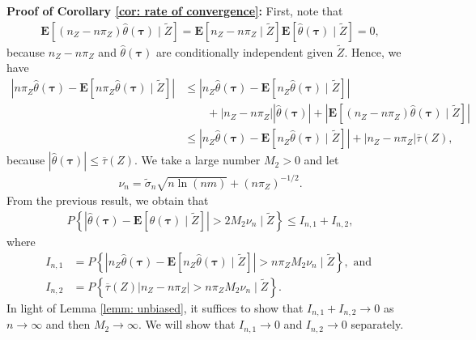 \documentclass[12pt, fullpage]{amsart}
\theoremstyle{definition}
\theoremstyle{definition}
\theoremstyle{definition}
\begin{document}
\begin{bibunit}[econometrica]
\noindent \textbf{Proof of Corollary \ref{cor: rate of convergence}:} First, note that 
\begin{align*}
    \mathbf{E}[(n_Z - n \pi_Z) \hat \theta(\boldsymbol{\tau}) \mid \tilde Z] = \mathbf{E}[n_Z - n \pi_Z \mid \tilde Z] \mathbf{E}[ \hat \theta(\boldsymbol{\tau}) \mid \tilde Z]= 0,
\end{align*}
because $n_Z - n \pi_Z$ and $\hat \theta(\boldsymbol{\tau})$ are conditionally independent given $\tilde Z$. Hence, we have 
\begin{align*}
    |n \pi_Z \hat \theta(\boldsymbol{\tau}) - \mathbf{E}[n \pi_Z \hat \theta(\boldsymbol{\tau}) \mid \tilde Z]| &\le |n_Z \hat \theta(\boldsymbol{\tau}) - \mathbf{E}[ n_Z \hat \theta(\boldsymbol{\tau}) \mid \tilde Z] | \\
    &\quad \quad + |n_Z - n \pi_Z| |\hat \theta(\boldsymbol{\tau})| + |\mathbf{E}[(n_Z - n \pi_Z) \hat \theta(\boldsymbol{\tau}) \mid \tilde Z]|\\
    &\le |n_Z \hat \theta(\boldsymbol{\tau}) - \mathbf{E}[ n_Z \hat \theta(\boldsymbol{\tau}) \mid \tilde Z] | + |n_Z - n \pi_Z| \overline \tau(Z), 
\end{align*}
because $|\hat \theta(\boldsymbol{\tau})| \le \overline \tau(Z)$. We take a large number $M_2>0$ and let 
\begin{align*}
    \nu_n = \tilde \sigma_n \sqrt{n\ln(n m)} + (n \pi_Z)^{-1/2}.
\end{align*}
From the previous result, we obtain that
\begin{align*}
    P\left\{ |\hat \theta(\boldsymbol{\tau}) - \mathbf{E}[ \hat \theta(\boldsymbol{\tau}) \mid \tilde Z]| > 2M_2 \nu_n \mid \tilde Z \right\} \le I_{n,1} + I_{n,2},
\end{align*}
where 
\begin{align*}
    I_{n,1} &= P\left\{ |n_Z \hat \theta(\boldsymbol{\tau}) - \mathbf{E}[ n_Z \hat \theta(\boldsymbol{\tau}) \mid \tilde Z]| > n \pi_Z M_2 \nu_n \mid \tilde Z \right\}, \text{ and }\\
    I_{n,2} &= P\left\{ \overline \tau(Z) |n_Z - n \pi_Z|  > n \pi_Z M_2 \nu_n \mid \tilde Z \right\}.
\end{align*}
In light of Lemma \ref{lemm: unbiased}, it suffices to show that $I_{n,1} + I_{n,2} \rightarrow 0$ as $n \rightarrow \infty$ and then $M_2 \rightarrow \infty$. We will show that $I_{n,1} \rightarrow 0$ and $I_{n,2} \rightarrow 0$ separately.


\end{bibunit}
\end{document}

